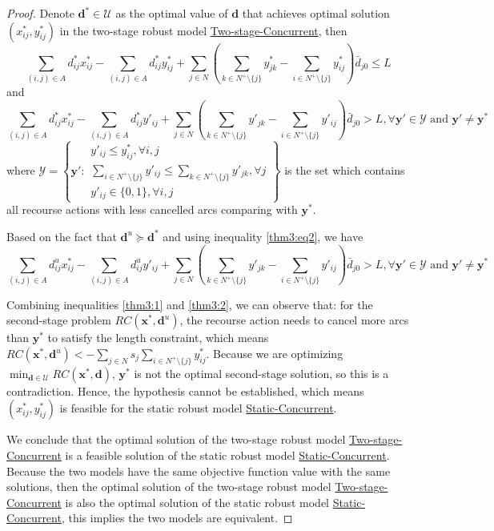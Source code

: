 \documentclass[preprint,review,10pt,round,authoryear]{elsarticle}\usepackage[]{graphicx}\usepackage[]{color}
\theoremstyle{plain}
\theoremstyle{definition}
\theoremstyle{remark}
\begin{document}
\begin{proof}
Denote $\mathbf{d}^*\in\mathcal{U}$ as the optimal value of $\mathbf{d}$ that achieves optimal solution  $(x_{ij}^*,y_{ij}^*)$ in the two-stage robust model \hyperref[2roc:1]{Two-stage-Concurrent}, then 
\begin{equation}
\sum_{(i,j)\in A}d^*_{ij}x^*_{ij}-\sum_{(i,j)\in A}d^*_{ij}y^*_{ij}+\sum_{j\in N}\left(\sum_{k\in N^+\setminus\{j\}}y^*_{jk}-\sum_{i\in N^+\setminus\{j\}}y^*_{ij}\right)\bar{d}_{j0}\leq L
\end{equation}
and
\begin{equation}
\sum_{(i,j)\in A}d^*_{ij}x^*_{ij}-\sum_{(i,j)\in A}d^*_{ij}y'_{ij}+\sum_{j\in N}\left(\sum_{k\in N^+\setminus\{j\}}y'_{jk}-\sum_{i\in N^+\setminus\{j\}}y'_{ij}\right)\bar{d}_{j0}> L,\forall \mathbf{y}'\in \mathcal{Y}\text{ and }\mathbf{y}'\neq \mathbf{y}^*\label{thm3:eq2}
\end{equation}
where $\mathcal{Y}=\left\{ \mathbf{y}':\begin{matrix}
y'_{ij}\leq y^*_{ij},\forall i,j\\ 
\sum_{i\in N^+\setminus\{j\}}y'_{ij}\leq \sum_{k\in N^+\setminus\{j\}}y'_{jk},\forall j\\ 
y'_{ij}\in \{0,1\},\forall i,j
\end{matrix} \right\}$ is the set which contains all recourse actions with less cancelled arcs comparing with $\mathbf{y}^*$.

Based on the fact that $\mathbf{d}^{u}\succeq \mathbf{d}^*$ and using inequality \eqref{thm3:eq2}, we have
\begin{equation}
\sum_{(i,j)\in A}d^{u}_{ij}x^*_{ij}-\sum_{(i,j)\in A}d^{u}_{ij}y'_{ij}+\sum_{j\in N}\left(\sum_{k\in N^+\setminus\{j\}}y'_{jk}-\sum_{i\in N^+\setminus\{j\}}y'_{ij}\right)\bar{d}_{j0}> L,\forall \mathbf{y}'\in \mathcal{Y}\text{ and }\mathbf{y}'\neq \mathbf{y}^*\label{thm3:2}
\end{equation}


Combining inequalities \eqref{thm3:1} and \eqref{thm3:2}, we can observe that: for the second-stage problem $RC(\mathbf{x}^*,\mathbf{d}^{u})$, the recourse action needs to cancel more arcs than $\mathbf{y}^*$ to satisfy the length constraint, which means $RC(\mathbf{x}^*,\mathbf{d}^{u})< -\sum_{j\in N}s_j\sum_{i\in N^+\setminus\{j\}}y^*_{ij}$. Because we are optimizing $\min_{\mathbf{d}\in\mathcal{U}}RC(\mathbf{x}^*,\mathbf{d})$, $\mathbf{y}^*$ is not the optimal second-stage solution, so this is a contradiction. Hence, the hypothesis cannot be established, which means $(x_{ij}^*,y_{ij}^*)$ is feasible for the static robust model \hyperref[sro:2]{Static-Concurrent}.


We conclude that the optimal solution of the two-stage robust model \hyperref[2roc:1]{Two-stage-Concurrent} is a feasible solution of the static robust model \hyperref[sro:2]{Static-Concurrent}. Because the two models have the same objective function value with the same solutions, then the optimal solution of the two-stage robust model \hyperref[2roc:1]{Two-stage-Concurrent} is also the optimal solution of the static robust model \hyperref[sro:2]{Static-Concurrent}, this implies the two models are equivalent.
\end{proof}
\end{document}
